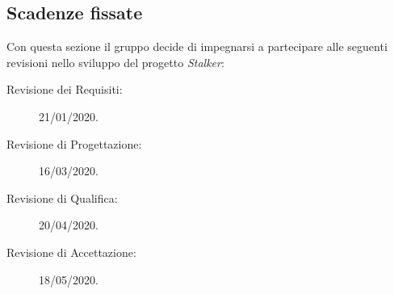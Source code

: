\documentclass[../piano-di-progetto.tex]{subfiles}
\begin{document}
\subsection{Scadenze fissate}%
\label{sub:scadenze_fissate}
Con questa sezione il gruppo decide di impegnarsi a partecipare alle seguenti revisioni nello sviluppo del progetto \textit{Stalker}:
  \begin{description}
    \item[Revisione dei Requisiti:] 21/01/2020.
    \item[Revisione di Progettazione:] 16/03/2020.
    \item[Revisione di Qualifica:] 20/04/2020.
    \item[Revisione di Accettazione:] 18/05/2020.
  \end{description}
\end{document}
